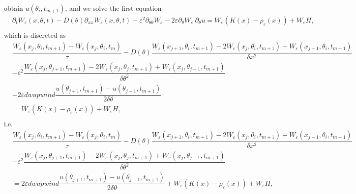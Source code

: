 \documentclass[preprint]{elsarticle}
\numberwithin{equation}{section}
\begin{document}
obtain $u(\theta_i, t_{m+1})$, and we solve the first equation
\begin{equation}
\begin{aligned}
&\partial_t W_\varepsilon(x,\theta,t) - D(\theta)\partial_{xx} W_\varepsilon(x,\theta,t) -\varepsilon^2\partial_{\theta\theta} W_\varepsilon - 2\varepsilon\partial_{\theta} W_\varepsilon~ \partial_\theta u = W_\varepsilon (K(x)-\rho_\varepsilon(x)) + W_\varepsilon H,\\
\end{aligned}
\end{equation}
which is discreted as
 \begin{equation}
\begin{aligned}
&\dfrac{ W_\varepsilon(x_j, \theta_i, t_{m+1}) - W_\varepsilon(x_j, \theta_i, t_m)}{\tau}-D(\theta)\dfrac{W_\varepsilon(x_{j+1},\theta_i, t_{m+1}) - 2W_\varepsilon(x_j,\theta_i,t_{m+1}) + W_\varepsilon(x_{j-1}, \theta_i, t_{m+1})}{\delta x^2} \\
&-\varepsilon^2\dfrac{W_\varepsilon(x_j,\theta_{j+1},t_{m+1})-2W_\varepsilon(x_j,\theta_{j}, t_{m+1})+W_\varepsilon(x_j,\theta_{j-1}, t_{m+1})}{\delta\theta^2} \\
&- 2\varepsilon dwupwind\dfrac{u(\theta_{j+1},t_{m+1}) -u(\theta_{j-1},t_{m+1})}{2\delta\theta} \\
&= W_\varepsilon (K(x)-\rho_\varepsilon(x)) + W_\varepsilon H,\\
\end{aligned}
\end{equation}
i.e.
 \begin{equation}
\begin{aligned}
&\dfrac{ W_\varepsilon(x_j, \theta_i, t_{m+1}) - W_\varepsilon(x_j, \theta_i, t_m)}{\tau}-D(\theta)\dfrac{W_\varepsilon(x_{j+1},\theta_i, t_{m+1}) - 2W_\varepsilon(x_j,\theta_i,t_{m+1}) + W_\varepsilon(x_{j-1}, \theta_i, t_{m+1})}{\delta x^2} \\
&-\varepsilon^2\dfrac{W_\varepsilon(x_j,\theta_{j+1},t_{m+1})-2W_\varepsilon(x_j,\theta_{j}, t_{m+1})+W_\varepsilon(x_j,\theta_{j-1}, t_{m+1})}{\delta\theta^2} \\
&= 2\varepsilon dwupwind\dfrac{u(\theta_{j+1},t_{m+1}) -u(\theta_{j-1},t_{m+1})}{2\delta\theta}
+ W_\varepsilon (K(x)-\rho_\varepsilon(x)) + W_\varepsilon H,\\
\end{aligned}
\end{equation}
\end{document}
